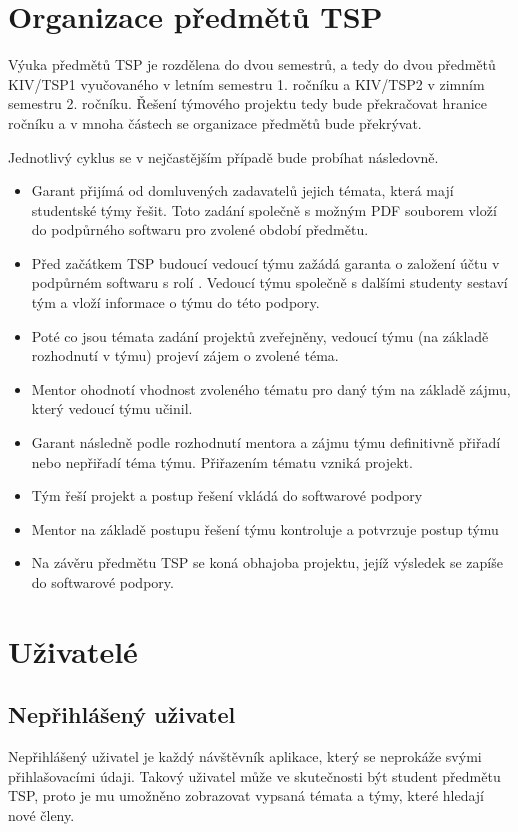 \documentclass[czech,BP]{thesiskiv}
\begin{document}
\section{Organizace předmětů TSP}
	\par Výuka předmětů TSP je rozdělena do dvou semestrů, a tedy do dvou předmětů KIV/TSP1 vyučovaného v letním semestru 1. ročníku a KIV/TSP2 v zimním semestru 2. ročníku. Řešení týmového projektu tedy bude překračovat hranice ročníku a v mnoha částech se organizace předmětů bude překrývat.
	\par Jednotlivý cyklus se v nejčastějším případě bude probíhat následovně. 
	\begin{itemize}
		\item Garant přijímá od domluvených zadavatelů jejich témata, která mají studentské týmy řešit. Toto zadání společně s možným PDF souborem vloží do podpůrného softwaru pro zvolené období předmětu.
		\item Před začátkem TSP budoucí vedoucí týmu zažádá garanta o založení účtu v podpůrném softwaru s rolí . Vedoucí týmu společně s dalšími studenty sestaví tým a vloží informace o týmu do této podpory.
		\item Poté co jsou témata zadání projektů zveřejněny, vedoucí týmu (na základě rozhodnutí v týmu) projeví zájem o zvolené téma.
		\item Mentor ohodnotí vhodnost zvoleného tématu pro daný tým na základě zájmu, který vedoucí týmu učinil.
		\item Garant následně podle rozhodnutí mentora a zájmu týmu definitivně přiřadí nebo nepřiřadí téma týmu. Přiřazením tématu vzniká projekt.
		\item Tým řeší projekt a postup řešení vkládá do softwarové podpory
		\item Mentor na základě postupu řešení týmu kontroluje a potvrzuje postup týmu
		\item Na závěru předmětu TSP se koná obhajoba projektu, jejíž výsledek se zapíše do softwarové podpory.
	\end{itemize}
\section{Uživatelé}
	\subsection{Nepřihlášený uživatel}
		\par Nepřihlášený uživatel je každý návštěvník aplikace, který se neprokáže svými přihlašovacími údaji. Takový uživatel může ve skutečnosti být student předmětu TSP, proto je mu umožněno zobrazovat vypsaná témata a týmy, které hledají nové členy.
\end{document}
